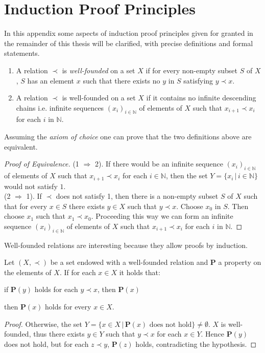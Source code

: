 \chapter{Induction Proof Principles}
In this appendix some aspects of induction proof principles given for granted in the remainder of this thesis will be clarified, with precise definitions and formal statements.
\begin{definition}\hfill
	\begin{enumerate}
	\item A relation $\prec$ is \emph{well-founded} on a set $X$ if for every non-empty subset $S$ of $X$, $S$ has an  element $x$ such that there exists no $y$ in $S$ satisfying $y\prec x$.
	\item A relation $\prec$ is well-founded on a set $X$ if it contains no infinite descending chains i.e. infinite sequences $(x_i)_{i\in\mathbb{N}}$ of elements of $X$ such that $x_{i+1}\prec x_i$ for each $i$ in $\mathbb{N}$.
	\end{enumerate}
\end{definition}
Assuming the \emph{axiom of choice} one can prove that the two definitions above are equivalent.
\begin{proof}[Proof of Equivalence]
	(1 $\Rightarrow$ 2). If there would be an infinite sequence $(x_i)_{i\in\mathbb{N}}$ of elements of $X$ such that $x_{i+1}\prec x_i$ for each $i\in\mathbb{N}$, then the set $Y=\{x_i\,|\,i\in\mathbb{N}\}$ would not satisfy $1$.\\
	(2 $\Rightarrow$ 1). If $\prec$ does not satisfy 1, then there is a non-empty subset $S$ of $X$ such that for every $x\in S$ there exists $y\in X$ such that $y\prec x$. Choose $x_0$ in $S$. Then choose $x_1$ such that $x_1\prec x_0$. Proceeding this way we can form an infinite sequence $(x_i)_{i\in\mathbb{N}}$ of elements of $X$ such that $x_{i+1}\prec x_i$ for each $i$ in $\mathbb{N}$.
\end{proof}
Well-founded relations are interesting because they allow proofs by induction.
\begin{proposition}
	Let $(X,\prec)$ be a set endowed with a well-founded relation and $\mathbf{P}$ a property on the elements of $X$. If for each $x\in X$ it holds that: 
	\begin{center} if $\mathbf{P}(y)$ holds  for each $y\prec x$, then $\mathbf{P}(x)$\end{center}
	then $\mathbf{P}(x)$ holds for every $x\in X$.
\end{proposition}
\begin{proof}
	Otherwise, the set $Y=\{x\in X\,|\,\mathbf{P}(x)\textrm{ does not hold}\}\neq\emptyset$. $X$ is well-founded, thus there exists $y\in Y$ such that $y\prec x$ for each $x\in Y$. Hence $\mathbf{P}(y)$ does not hold, but for each $z\prec y$, $\mathbf{P}(z)$ holds, contradicting the hypothesis.
\end{proof}

